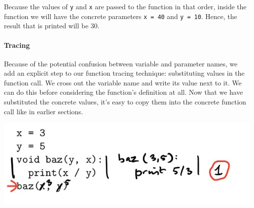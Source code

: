 Because the values of \texttt{y} and \texttt{x} are passed to the function in that order, inside the function we will have the concrete parameters \texttt{x = 40} and \texttt{y = 10}. Hence, the result that is printed will be 30.

\paragraph{Tracing}

Because of the potential confusion between variable and parameter names, we add an explicit step to our function tracing technique: substituting values in the function call. We cross out the variable name and write its value next to it. We can do this before considering the function's definition at all. Now that we have substituted the concrete values, it's easy to copy them into the concrete function call like in earlier sections.

\includegraphics[width=.8\textwidth]{3-trace-varsparams.jpeg}
